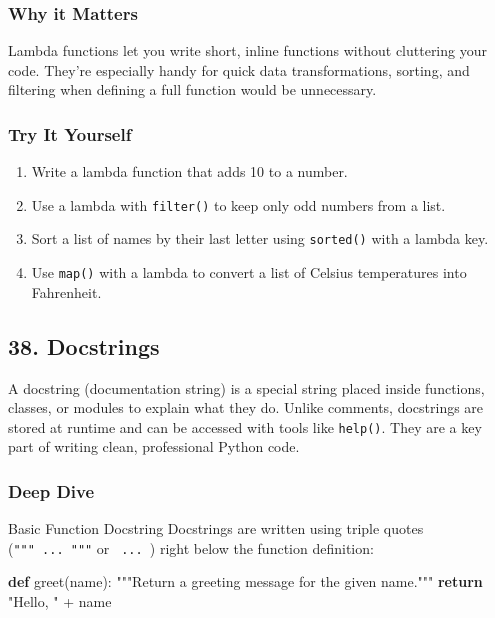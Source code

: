 \documentclass[
  letterpaper,
  DIV=11,
  numbers=noendperiod]{scrreprt}
\newenvironment{Shaded}{\begin{snugshade}}{\end{snugshade}}
\newcommand{\CommentTok}[1]{\textcolor[rgb]{0.37,0.37,0.37}{#1}}
\newcommand{\ControlFlowTok}[1]{\textcolor[rgb]{0.00,0.23,0.31}{\textbf{#1}}}
\newcommand{\KeywordTok}[1]{\textcolor[rgb]{0.00,0.23,0.31}{\textbf{#1}}}
\newcommand{\NormalTok}[1]{\textcolor[rgb]{0.00,0.23,0.31}{#1}}
\newcommand{\OperatorTok}[1]{\textcolor[rgb]{0.37,0.37,0.37}{#1}}
\newcommand{\StringTok}[1]{\textcolor[rgb]{0.13,0.47,0.30}{#1}}
\providecommand{\tightlist}{%
  \setlength{\itemsep}{0pt}\setlength{\parskip}{0pt}}
\begin{document}
\subsubsection{Why it Matters}\label{why-it-matters-36}

Lambda functions let you write short, inline functions without
cluttering your code. They're especially handy for quick data
transformations, sorting, and filtering when defining a full function
would be unnecessary.

\subsubsection{Try It Yourself}\label{try-it-yourself-36}

\begin{enumerate}
\def\labelenumi{\arabic{enumi}.}
\tightlist
\item
  Write a lambda function that adds 10 to a number.
\item
  Use a lambda with \texttt{filter()} to keep only odd numbers from a
  list.
\item
  Sort a list of names by their last letter using \texttt{sorted()} with
  a lambda key.
\item
  Use \texttt{map()} with a lambda to convert a list of Celsius
  temperatures into Fahrenheit.
\end{enumerate}

\subsection{38. Docstrings}\label{docstrings}

A docstring (documentation string) is a special string placed inside
functions, classes, or modules to explain what they do. Unlike comments,
docstrings are stored at runtime and can be accessed with tools like
\texttt{help()}. They are a key part of writing clean, professional
Python code.

\subsubsection{Deep Dive}\label{deep-dive-37}

Basic Function Docstring Docstrings are written using triple quotes
(\texttt{"""\ ...\ """} or
\texttt{\textquotesingle{}\textquotesingle{}\textquotesingle{}\ ...\ \textquotesingle{}\textquotesingle{}\textquotesingle{}})
right below the function definition:

\begin{Shaded}
\begin{Highlighting}[]
\KeywordTok{def}\NormalTok{ greet(name):}
    \CommentTok{"""Return a greeting message for the given name."""}
    \ControlFlowTok{return} \StringTok{"Hello, "} \OperatorTok{+}\NormalTok{ name}
\end{Highlighting}
\end{Shaded}
\end{document}
